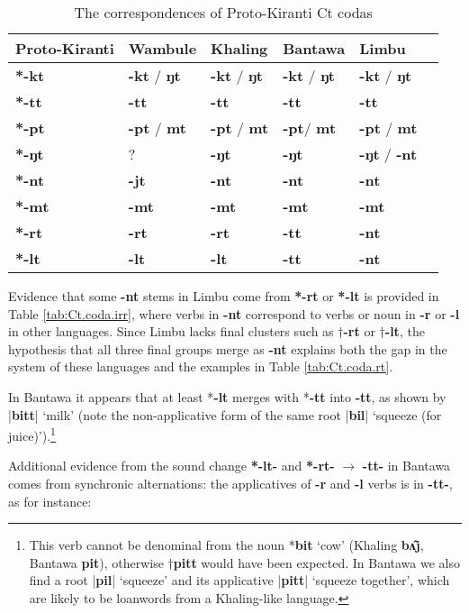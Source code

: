 \documentclass[oneside,a4paper,11pt]{article}
\newcommand{\ipa}[1]{\textbf{{\phon\mbox{#1}}}} %
\newcommand{\dhatu}[2]{|\ipa{#1}| `#2'}
\begin{document}
\begin{table}[H]
\caption{The correspondences of Proto-Kiranti Ct codas} \centering \label{tab:Ct.coda}
\begin{tabular}{llllll}
\toprule
Proto-Kiranti & Wambule & Khaling & Bantawa & Limbu \\
\midrule
\ipa{*-kt} & \ipa{-kt} / \ipa{ŋt} & \ipa{-kt} / \ipa{ŋt} & \ipa{-kt} / \ipa{ŋt} & \ipa{-kt} / \ipa{ŋt}  \\
\ipa{*-tt} & \ipa{-tt} & \ipa{-tt}  & \ipa{-tt} & \ipa{-tt} \\
\ipa{*-pt} & \ipa{-pt} / \ipa{mt} & \ipa{-pt} / \ipa{mt}& \ipa{-pt}/ \ipa{mt} & \ipa{-pt} / \ipa{mt} \\
\midrule
\ipa{*-ŋt} & ?& \ipa{-ŋt} & \ipa{-ŋt} & \ipa{-ŋt}  / \ipa{-nt} \\
\ipa{*-nt} & \ipa{-jt}  & \ipa{-nt} & \ipa{-nt} & \ipa{-nt}  \\
\ipa{*-mt} & \ipa{-mt} & \ipa{-mt} & \ipa{-mt} & \ipa{-mt}  \\
\midrule
\ipa{*-rt} &  \ipa{-rt}  & \ipa{-rt} & \ipa{-tt}  & \ipa{-nt}  \\
\ipa{*-lt} & \ipa{-lt} & \ipa{-lt} & \ipa{-tt} & \ipa{-nt}  \\
\bottomrule
\end{tabular}
\end{table}

Evidence that some \ipa{-nt} stems in Limbu come from \ipa{*-rt} or \ipa{*-lt} is provided in Table \ref{tab:Ct.coda.irr}, where verbs in \ipa{-nt} correspond to verbs or noun in \ipa{-r} or \ipa{-l} in other languages. Since  Limbu  lacks final clusters such as $\dagger$\ipa{-rt} or $\dagger$\ipa{-lt}, the hypothesis that all three final groups merge as \ipa{-nt} explains both the gap in the system of these languages and the examples in Table \ref{tab:Ct.coda.rt}. 

In Bantawa it appears that at least *\ipa{-lt} merges with *\ipa{-tt} into \ipa{-tt}, as shown by \dhatu{bitt}{milk} (note the non-applicative form of the same root \dhatu{bil}{squeeze (for juice)}).\footnote{This verb cannot be denominal from the noun *\ipa{bit} `cow'  (Khaling \ipa{bʌ̂j}, Bantawa \ipa{pit}), otherwise $\dagger$\ipa{pitt} would have been expected. In Bantawa we also find a root  \dhatu{pil}{squeeze} and its applicative \dhatu{pitt}{squeeze together}, which are likely to be loanwords from a Khaling-like language.}

Additional evidence from the sound change \ipa{*-lt-} and  \ipa{*-rt-} $\rightarrow$ \ipa{-tt-} in Bantawa comes from synchronic alternations: the applicatives of \ipa{-r} and \ipa{-l} verbs is in \ipa{-tt-}, as for instance:
\end{document}
